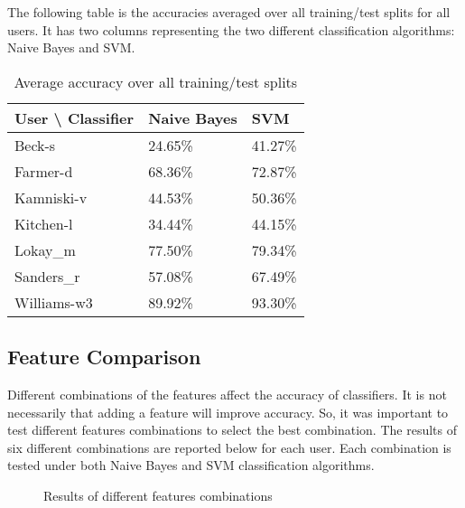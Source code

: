 The following table is the accuracies averaged over all training/test splits for all users. It has two columns representing the two different classification algorithms: Naive Bayes and SVM.

\begin{table} [!htbp]
	\begin{center}

	    \begin{tabular}{ | l | l | l |}
	    \hline
	    User {\textbackslash}  Classifier & Naive Bayes & SVM \\ \hline
	    Beck-s & 24.65\% & 41.27\% \\ \hline
	    Farmer-d & 68.36\% & 72.87\% \\ \hline
	    Kamniski-v & 44.53\% & 50.36\% \\ \hline
	    Kitchen-l & 34.44\% & 44.15\% \\ \hline
	    Lokay\_m & 77.50\% & 79.34\% \\ \hline
	    Sanders\_r & 57.08\% & 67.49\% \\ \hline
	    Williams-w3 & 89.92\% & 93.30\% \\
	    \hline
	    \end{tabular}
	\caption{Average accuracy over all training/test splits}
	\end{center}
\end{table}

\subsection{Feature Comparison}
Different combinations of the features affect the accuracy of classifiers. It is not necessarily that adding a feature will improve accuracy. So, it was important to test different features combinations to select the best combination. The results of six different combinations are reported below for each user. Each combination is tested under both Naive Bayes and SVM classification algorithms.

\begin{figure}[H]
    \begin{center}
    \end{center}
    \caption{Results of different features combinations}
\end{figure}

